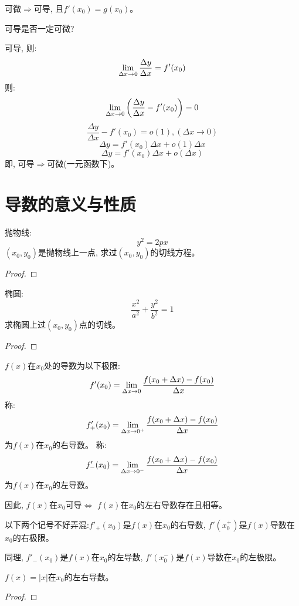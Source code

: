 可微$\Rightarrow$可导, 且$f'(x_0) = g(x_0)$。

可导是否一定可微?

可导, 则:
\[ \lim_{\Delta x \to 0 } \frac{\Delta y}{\Delta x} = f'(x_0)\]
则:
\[  \lim_{\Delta x \to 0 } \left(\frac{\Delta y}{\Delta x} - f'(x_0) \right) = 0 \]
\[ \frac{\Delta y}{\Delta x} - f'(x_0) = o(1), (\Delta x \to 0) \]
\[ \Delta y = f'(x_0)\Delta x + o(1)\Delta x \]
\[ \Delta y = f'(x_0)\Delta x + o(\Delta x) \]
即, 可导$\Rightarrow$可微(一元函数下)。

\section{导数的意义与性质}
\begin{proposition}
    抛物线:
    \[ y^2 = 2px \]
    $(x_0, y_0)$是抛物线上一点, 求过$(x_0, y_0)$的切线方程。
\end{proposition}
\begin{proof}
    
\end{proof}

\begin{proposition}
    椭圆:
    \[ \frac{x^2}{a^2} + \frac{y^2}{b^2} = 1 \]
    求椭圆上过$(x_0, y_0)$点的切线。
\end{proposition}
\begin{proof}
    
\end{proof}

$f(x)$在$x_0$处的导数为以下极限:
\[ f'(x_0) = \lim_{\Delta x \to 0 } \frac{f(x_0+\Delta x) - f(x_0)}{\Delta x}\]
称:
\[ f'_+(x_0) = \lim_{\Delta x \to 0^+ } \frac{f(x_0+\Delta x) - f(x_0)}{\Delta x}\]
为$f(x)$在$x_0$的右导数。
称:
\[ f'_-(x_0) = \lim_{\Delta x \to 0^- } \frac{f(x_0+\Delta x) - f(x_0)}{\Delta x}\]
为$f(x)$在$x_0$的左导数。

因此, $f(x)$在$x_0$可导$\Longleftrightarrow$ $f(x)$在$x_0$的左右导数存在且相等。

以下两个记号不好弄混:$f'_+(x_0)$是$f(x)$在$x_0$的右导数, $f'(x_0^+)$是$f(x)$导数在$x_0$的右极限。

同理, $f'_-(x_0)$是$f(x)$在$x_0$的左导数, $f'(x_0^-)$是$f(x)$导数在$x_0$的左极限。

\begin{proposition}
    $f(x) = \left| x \right|$在$x_0$的左右导数。
\end{proposition}
\begin{proof}
    
\end{proof}


